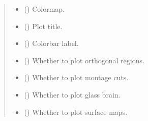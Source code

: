 \documentclass[letterpaper,10pt,english]{sphinxhowto}
\begin{document}
\begin{fulllineitems}
\begin{quote}
\begin{description}
\begin{itemize}
\item {} 
\sphinxAtStartPar
{} (\sphinxstyleliteralemphasis{\sphinxupquote{, }}) \textendash{} Colormap.

\item {} 
\sphinxAtStartPar
{} (\sphinxstyleliteralemphasis{\sphinxupquote{, }}) \textendash{} Plot title.

\item {} 
\sphinxAtStartPar
{} (\sphinxstyleliteralemphasis{\sphinxupquote{, }}) \textendash{} Colorbar label.

\item {} 
\sphinxAtStartPar
{} (\sphinxstyleliteralemphasis{\sphinxupquote{, }}) \textendash{} Whether to plot orthogonal regions.

\item {} 
\sphinxAtStartPar
{} (\sphinxstyleliteralemphasis{\sphinxupquote{, }}) \textendash{} Whether to plot montage cuts.

\item {} 
\sphinxAtStartPar
{} (\sphinxstyleliteralemphasis{\sphinxupquote{, }}) \textendash{} Whether to plot glass brain.

\item {} 
\sphinxAtStartPar
{} (\sphinxstyleliteralemphasis{\sphinxupquote{, }}) \textendash{} Whether to plot surface maps.


\end{itemize}
\end{description}
\end{quote}
\end{fulllineitems}
\end{document}
